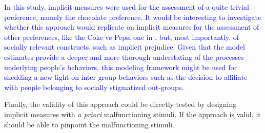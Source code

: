 \documentclass[12pt]{book}
\begin{document}
\textcolor{blue}{In this study, implicit measures were used for the assessment of a quite trivial preference, namely the chocolate preference. It would be interesting to investigate whether this approach would replicate on implicit measures for the assessment of other preferences, like the Coke vs Pepsi one  in , but, most importantly, of socially relevant constructs, such as implicit prejudice. 
	Given that the model estimates provide a deeper and more thorough understating of the processes underlying people's behaviors, this modeling framework might be used for shedding a new light on inter group behaviors such as the decision to affiliate with people belonging to socially stigmatized out-groups. 
}

Finally, the validity of this approach could be directly tested by designing implicit measures with \emph{a priori} malfunctioning stimuli. If the approach is valid, it should be able to pinpoint the malfunctioning stimuli. 
\end{document}
